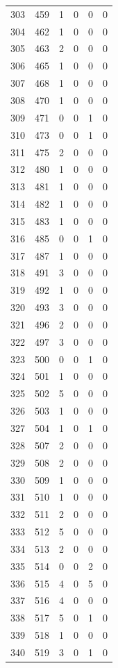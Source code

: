 \documentclass[
  letterpaper,
  DIV=11,
  numbers=noendperiod]{scrreprt}
\begin{document}
\begin{longtable}[]{@{}rrrrrr@{}}
303 & 459 & 1 & 0 & 0 & 0 \\
304 & 462 & 1 & 0 & 0 & 0 \\
305 & 463 & 2 & 0 & 0 & 0 \\
306 & 465 & 1 & 0 & 0 & 0 \\
307 & 468 & 1 & 0 & 0 & 0 \\
308 & 470 & 1 & 0 & 0 & 0 \\
309 & 471 & 0 & 0 & 1 & 0 \\
310 & 473 & 0 & 0 & 1 & 0 \\
311 & 475 & 2 & 0 & 0 & 0 \\
312 & 480 & 1 & 0 & 0 & 0 \\
313 & 481 & 1 & 0 & 0 & 0 \\
314 & 482 & 1 & 0 & 0 & 0 \\
315 & 483 & 1 & 0 & 0 & 0 \\
316 & 485 & 0 & 0 & 1 & 0 \\
317 & 487 & 1 & 0 & 0 & 0 \\
318 & 491 & 3 & 0 & 0 & 0 \\
319 & 492 & 1 & 0 & 0 & 0 \\
320 & 493 & 3 & 0 & 0 & 0 \\
321 & 496 & 2 & 0 & 0 & 0 \\
322 & 497 & 3 & 0 & 0 & 0 \\
323 & 500 & 0 & 0 & 1 & 0 \\
324 & 501 & 1 & 0 & 0 & 0 \\
325 & 502 & 5 & 0 & 0 & 0 \\
326 & 503 & 1 & 0 & 0 & 0 \\
327 & 504 & 1 & 0 & 1 & 0 \\
328 & 507 & 2 & 0 & 0 & 0 \\
329 & 508 & 2 & 0 & 0 & 0 \\
330 & 509 & 1 & 0 & 0 & 0 \\
331 & 510 & 1 & 0 & 0 & 0 \\
332 & 511 & 2 & 0 & 0 & 0 \\
333 & 512 & 5 & 0 & 0 & 0 \\
334 & 513 & 2 & 0 & 0 & 0 \\
335 & 514 & 0 & 0 & 2 & 0 \\
336 & 515 & 4 & 0 & 5 & 0 \\
337 & 516 & 4 & 0 & 0 & 0 \\
338 & 517 & 5 & 0 & 1 & 0 \\
339 & 518 & 1 & 0 & 0 & 0 \\
340 & 519 & 3 & 0 & 1 & 0 \\

\end{longtable}
\end{document}
